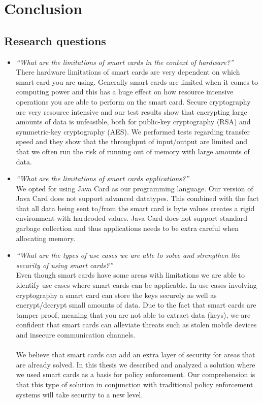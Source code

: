 \chapter{Conclusion}
\label{ch:conclusion}

\section{Research questions}
\begin{itemize}
  \item \textit{``What are the limitations of smart cards in the context of hardware?''}\\
  There hardware limitations of smart cards are very dependent on which smart card you are using. Generally smart cards are limited when it comes to computing power and this has a huge effect on how resource intensive operations you are able to perform on the smart card. Secure cryptography are very resource intensive and our test results show that encrypting large amounts of data is unfeasible, both for public-key cryptography (RSA) and symmetric-key cryptography (AES). We performed tests regarding transfer speed and they show that the throughput of input/output are limited and that we often run the risk of running out of memory with large amounts of data.
  \item \textit{``What are the limitations of smart cards applications?''}\\
  We opted for using Java Card as our programming language. Our version of Java Card does not support advanced datatypes. This combined with the fact that all data being sent to/from the smart card is byte values creates a rigid environment with hardcoded values. Java Card does not support standard garbage collection and thus applications needs to be extra careful when allocating memory.
  \item \textit{``What are the types of use cases we are able to solve and strengthen the security of using smart cards?''}\\
  Even though smart cards have some areas with limitations we are able to identify use cases where smart cards can be applicable. In use cases involving cryptography a smart card can store the keys securely as well as encrypt/decrypt small amounts of data. Due to the fact that smart cards are tamper proof, meaning that you are not able to extract data (keys), we are confident that smart cards can alleviate threats such as stolen mobile devices and insecure communication channels.\mbox{}\\\\  We believe that smart cards can add an extra layer of security for areas that are already solved. In this thesis we described and analyzed a solution where we used smart cards as a basis for policy enforcement. Our comprehension is that this type of solution in conjunction with traditional policy enforcement systems will take security to a new level.
\end{itemize}

